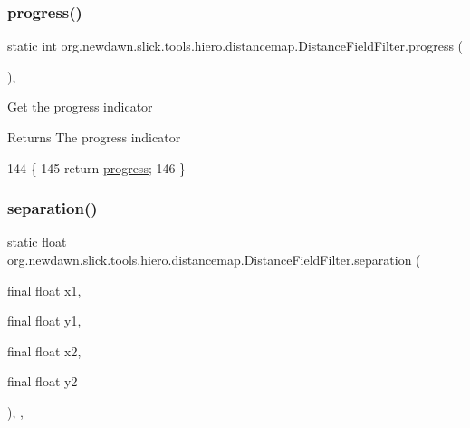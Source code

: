 \subsubsection{\texorpdfstring{progress()}{progress()}}
{\footnotesize\ttfamily static int org.\+newdawn.\+slick.\+tools.\+hiero.\+distancemap.\+Distance\+Field\+Filter.\+progress (\begin{DoxyParamCaption}{ }\end{DoxyParamCaption})\hspace{0.3cm}{\ttfamily [inline]}, {\ttfamily [static]}}

Get the progress indicator

\begin{DoxyReturn}{Returns}
The progress indicator 
\end{DoxyReturn}

\begin{DoxyCode}
144                                  \{
145         \textcolor{keywordflow}{return} \mbox{\hyperlink{classorg_1_1newdawn_1_1slick_1_1tools_1_1hiero_1_1distancemap_1_1_distance_field_filter_aa00f09a7d2e13879b1434ed53aea0eef}{progress}};
146     \}
\end{DoxyCode}
\mbox{\label{classorg_1_1newdawn_1_1slick_1_1tools_1_1hiero_1_1distancemap_1_1_distance_field_filter_a22ed8f3b6d1c38791056d8a063d85452}} 
\subsubsection{\texorpdfstring{separation()}{separation()}}
{\footnotesize\ttfamily static float org.\+newdawn.\+slick.\+tools.\+hiero.\+distancemap.\+Distance\+Field\+Filter.\+separation (\begin{DoxyParamCaption}\item[{final float}]{x1,  }\item[{final float}]{y1,  }\item[{final float}]{x2,  }\item[{final float}]{y2 }\end{DoxyParamCaption})\hspace{0.3cm}{\ttfamily [inline]}, {\ttfamily [static]}, {\ttfamily [private]}}

